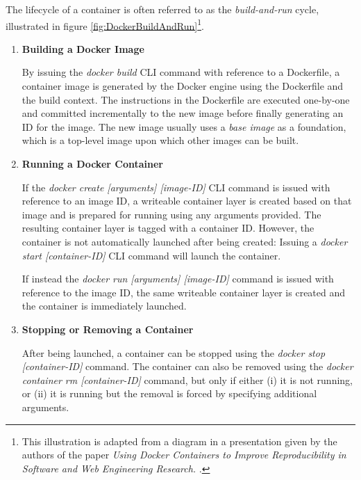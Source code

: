 The lifecycle of a container is often referred to as the \textit{build-and-run} cycle, illustrated in figure \ref{fig:DockerBuildAndRun}\footnote{This illustration is adapted from a diagram in a presentation given by the authors of the paper \textit{Using Docker Containers to Improve Reproducibility in Software and Web Engineering Research.} \cite{ReproducableResearchEnvironmentsContainers} \cite{DockerBuildAndRunDiagram}.}.

\begin{enumerate}
\item \textbf{Building a Docker Image}

By issuing the \textit{docker build} CLI command with reference to a Dockerfile, a container image is generated by the Docker engine using the Dockerfile and the build context. The instructions in the Dockerfile are executed one-by-one and committed incrementally to the new image before finally generating an ID for the image. The new image usually uses a \textit{base image} as a foundation, which is a top-level image upon which other images can be built.

\item \textbf{Running a Docker Container}

If the \textit{docker create [arguments] [image-ID]} CLI command is issued with reference to an image ID, a writeable container layer is created based on that image and is prepared for running using any arguments provided. The resulting container layer is tagged with a container ID. However, the container is not automatically launched after being created: Issuing a \textit{docker start [container-ID]} CLI command will launch the container.

If instead the \textit{docker run [arguments] [image-ID]} command is issued with reference to the image ID, the same writeable container layer is created and the container is immediately launched. 

\item \textbf{Stopping or Removing a Container}

After being launched, a container can be stopped using the \textit{docker stop [container-ID]} command. The container can also be removed using the \textit{docker container rm [container-ID]} command, but only if either (i) it is not running, or (ii) it is running but the removal is forced by specifying additional arguments.

\end{enumerate}

